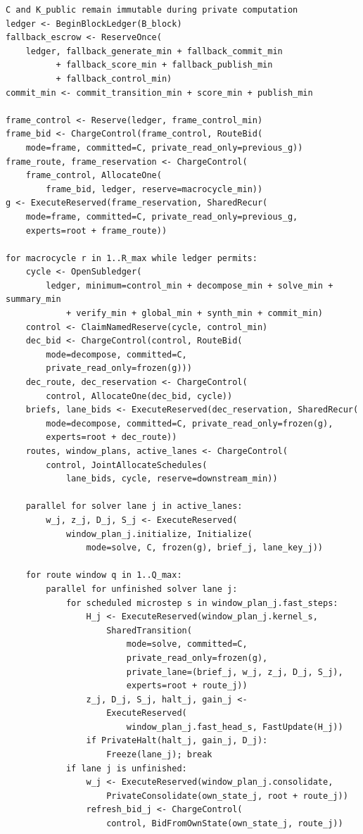 \documentclass[10pt,a4paper]{article}
\begin{document}
\begin{lstlisting}[caption={Budgeted dispatch and state-isolated parallel solving.},label={lst:dispatch}]
C and K_public remain immutable during private computation
ledger <- BeginBlockLedger(B_block)
fallback_escrow <- ReserveOnce(
    ledger, fallback_generate_min + fallback_commit_min
          + fallback_score_min + fallback_publish_min
          + fallback_control_min)
commit_min <- commit_transition_min + score_min + publish_min

frame_control <- Reserve(ledger, frame_control_min)
frame_bid <- ChargeControl(frame_control, RouteBid(
    mode=frame, committed=C, private_read_only=previous_g))
frame_route, frame_reservation <- ChargeControl(
    frame_control, AllocateOne(
        frame_bid, ledger, reserve=macrocycle_min))
g <- ExecuteReserved(frame_reservation, SharedRecur(
    mode=frame, committed=C, private_read_only=previous_g,
    experts=root + frame_route))

for macrocycle r in 1..R_max while ledger permits:
    cycle <- OpenSubledger(
        ledger, minimum=control_min + decompose_min + solve_min + summary_min
            + verify_min + global_min + synth_min + commit_min)
    control <- ClaimNamedReserve(cycle, control_min)
    dec_bid <- ChargeControl(control, RouteBid(
        mode=decompose, committed=C,
        private_read_only=frozen(g)))
    dec_route, dec_reservation <- ChargeControl(
        control, AllocateOne(dec_bid, cycle))
    briefs, lane_bids <- ExecuteReserved(dec_reservation, SharedRecur(
        mode=decompose, committed=C, private_read_only=frozen(g),
        experts=root + dec_route))
    routes, window_plans, active_lanes <- ChargeControl(
        control, JointAllocateSchedules(
            lane_bids, cycle, reserve=downstream_min))

    parallel for solver lane j in active_lanes:
        w_j, z_j, D_j, S_j <- ExecuteReserved(
            window_plan_j.initialize, Initialize(
                mode=solve, C, frozen(g), brief_j, lane_key_j))

    for route window q in 1..Q_max:
        parallel for unfinished solver lane j:
            for scheduled microstep s in window_plan_j.fast_steps:
                H_j <- ExecuteReserved(window_plan_j.kernel_s,
                    SharedTransition(
                        mode=solve, committed=C,
                        private_read_only=frozen(g),
                        private_lane=(brief_j, w_j, z_j, D_j, S_j),
                        experts=root + route_j))
                z_j, D_j, S_j, halt_j, gain_j <-
                    ExecuteReserved(
                        window_plan_j.fast_head_s, FastUpdate(H_j))
                if PrivateHalt(halt_j, gain_j, D_j):
                    Freeze(lane_j); break
            if lane j is unfinished:
                w_j <- ExecuteReserved(window_plan_j.consolidate,
                    PrivateConsolidate(own_state_j, root + route_j))
                refresh_bid_j <- ChargeControl(
                    control, BidFromOwnState(own_state_j, route_j))


\end{lstlisting}
\end{document}
